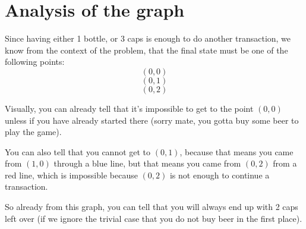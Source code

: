 \documentclass[letterpaper, 12pt]{article}
\begin{document}
\begin{center}
\end{center}
\section{Analysis of the graph}
Since having either 1 bottle, or 3 caps is enough to do another transaction, we know from the context of the problem, that the final state must be one of the following points:
$$(0, 0)$$
$$(0, 1)$$
$$(0, 2)$$

Visually, you can already tell that it's impossible to get to the point $(0, 0)$ unless if you have already started there (sorry mate, you gotta buy some beer to play the game).

You can also tell that you cannot get to $(0, 1)$, because that means you came from $(1, 0)$ through a blue line, but that means you came from $(0, 2)$ from a red line, which is impossible because $(0, 2)$ is not enough to continue a transaction.

So already from this graph, you can tell that you will always end up with 2 caps left over (if we ignore the trivial case that you do not buy beer in the first place).
\end{document}
